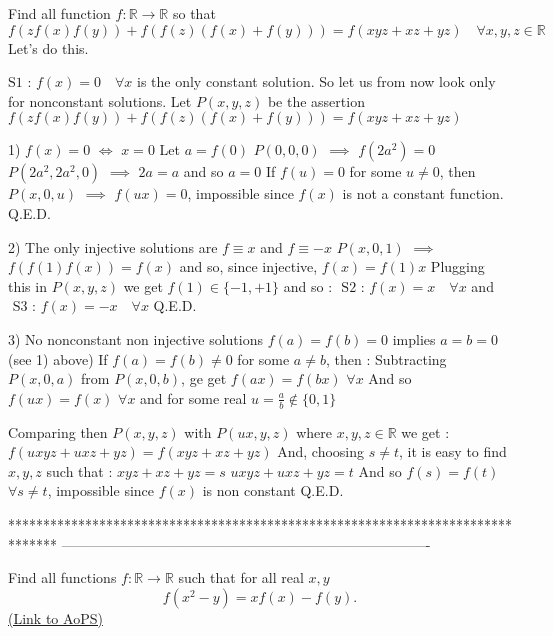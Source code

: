 \begin{solution}
	\begin{tcolorbox}Find all function $f : \mathbb{R} \to \mathbb{R}$ so that
$$f(z f(x) f(y)) + f( f(z) (f(x) + f(y) ) ) = f(xyz + xz + yz) \quad \forall x,y,z \in \mathbb{R}$$
 Let's do this.\end{tcolorbox}
$\boxed{\text{S1 : }f(x)=0\quad\forall x}$ is the only constant solution. So let us from now look only for nonconstant solutions.
Let $P(x,y,z)$ be the assertion $f(zf(x)f(y))+f(f(z)(f(x)+f(y)))=f(xyz+xz+yz)$

1) $f(x)=0$ $\iff$ $x=0$
Let $a=f(0)$
$P(0,0,0)$ $\implies$ $f(2a^2)=0$
$P(2a^2,2a^2,0)$ $\implies$ $2a=a$ and so $a=0$
If $f(u)=0$ for some $u\ne 0$, then $P(x,0,u)$ $\implies$ $f(ux)=0$, impossible since $f(x)$ is not a constant function.
Q.E.D.

2) The only injective solutions are $f\equiv x$ and $f\equiv -x$
$P(x,0,1)$ $\implies$ $f(f(1)f(x))=f(x)$ and so, since injective, $f(x)=f(1)x$
Plugging this in $P(x,y,z)$ we get $f(1)\in\{-1,+1\}$ and so :
$\boxed{\text{ S2 : }f(x)=x\quad\forall x}$ and $\boxed{\text{ S3 : }f(x)=-x\quad\forall x}$ 
Q.E.D.

3) No nonconstant non injective solutions
$f(a)=f(b)=0$ implies $a=b=0$ (see 1) above)
If $f(a)=f(b)\ne 0$ for some $a\ne b$, then :
Subtracting $P(x,0,a)$ from $P(x,0,b)$, ge get $f(ax)=f(bx)$ $\forall x$
And so $f(ux)=f(x)$ $\forall x$ and for some real $u=\frac ab\notin\{0,1\}$

Comparing then $P(x,y,z)$ with $P(ux,y,z)$ where $x,y,z\in\mathbb R$ we get :
$f(uxyz+uxz+yz)=f(xyz+xz+yz)$
And, choosing $s\ne t$, it is easy to find $x,y,z$ such that :
$xyz+xz+yz=s$
$uxyz+uxz+yz=t$
And so $f(s)=f(t)$ $\forall s\ne t$, impossible since $f(x)$ is non constant
Q.E.D.



\end{solution}
*******************************************************************************
-------------------------------------------------------------------------------

\begin{problem}
	Find all functions $f :\mathbb R \to \mathbb R$ such that for all real $x, y$
\[f(x^2 - y) = xf(x) - f(y).\]
	\flushright \href{https://artofproblemsolving.com/community/c6h1636471}{(Link to AoPS)}
\end{problem}



